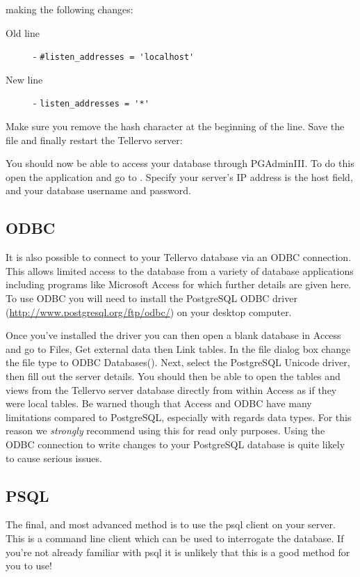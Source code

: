 making the following changes:

\begin{description}
 \item[Old line] - \verb|#listen_addresses = 'localhost'|
 \item[New line] - \verb|listen_addresses = '*'|
\end{description}

Make sure you remove the hash character at the beginning of the line.  Save the file and finally restart the Tellervo server:


You should now be able to access your database through PGAdminIII. To do this open the application and go to .  Specify your server's IP address is the host field, and your database username and password.


\subsection{ODBC}
It is also possible to connect to your Tellervo database via an ODBC connection.  This allows limited access to the database from a variety of database applications including programs like Microsoft Access for which further details are given here.   To use ODBC you will need to install the PostgreSQL ODBC driver (\url{http://www.postgresql.org/ftp/odbc/}) on your desktop computer.

Once you've installed the driver you can then open a blank database in Access and go to Files, Get external data then Link tables.  In the file dialog box change the file type to ODBC Databases().  Next, select the PostgreSQL Unicode driver, then fill out the server details.  You should then be able to open the tables and views from the Tellervo server database directly from within Access as if they were local tables.  Be warned though that Access and ODBC have many limitations compared to PostgreSQL, especially with regards data types.  For this reason we \emph{strongly} recommend using this for read only purposes.  Using the ODBC connection to write changes to your PostgreSQL database is quite likely to cause serious issues. 

\subsection{PSQL}
The final, and most advanced method is to use the psql client on your server.  This is a command line client which can be used to interrogate the database.  If you're not already familiar with psql it is unlikely that this is a good method for you to use!


